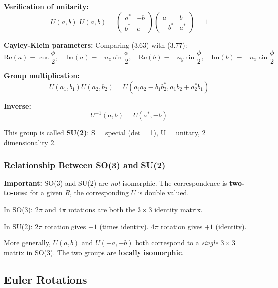 \documentclass[11pt,a4paper]{article}
\begin{document}
\textbf{Verification of unitarity:}
\begin{equation}
U(a,b)^\dagger U(a,b) = \begin{pmatrix} a^* & -b \\ b^* & a \end{pmatrix}\begin{pmatrix} a & b \\ -b^* & a^* \end{pmatrix} = 1
\tag{3.79}
\end{equation}

\textbf{Cayley-Klein parameters:} Comparing (3.63) with (3.77):
\begin{equation}
\text{Re}(a) = \cos\frac{\phi}{2}, \quad \text{Im}(a) = -n_z\sin\frac{\phi}{2}, \quad \text{Re}(b) = -n_y\sin\frac{\phi}{2}, \quad \text{Im}(b) = -n_x\sin\frac{\phi}{2}
\tag{3.80}
\end{equation}

\textbf{Group multiplication:}
\begin{equation}
U(a_1, b_1)U(a_2, b_2) = U(a_1 a_2 - b_1 b_2^*, a_1 b_2 + a_2^* b_1)
\tag{3.81}
\end{equation}

\textbf{Inverse:}
\begin{equation}
U^{-1}(a, b) = U(a^*, -b)
\tag{3.83}
\end{equation}

This group is called \textbf{SU(2)}: S = special (det = 1), U = unitary, 2 = dimensionality 2.

\subsubsection{Relationship Between SO(3) and SU(2)}

\textbf{Important:} SO(3) and SU(2) are \textit{not} isomorphic. The correspondence is \textbf{two-to-one}: for a given $R$, the corresponding $U$ is double valued.

In SO(3): $2\pi$ and $4\pi$ rotations are both the $3 \times 3$ identity matrix.

In SU(2): $2\pi$ rotation gives $-1$ (times identity), $4\pi$ rotation gives $+1$ (identity).

More generally, $U(a, b)$ and $U(-a, -b)$ both correspond to a \textit{single} $3 \times 3$ matrix in SO(3). The two groups are \textbf{locally isomorphic}.

\subsection{Euler Rotations}
\end{document}
